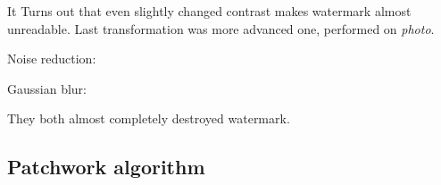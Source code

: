 \documentclass[a4paper, 12pt]{article}
\begin{document}
\newpage
    	It Turns out that even slightly changed contrast makes watermark almost unreadable. Last transformation was more advanced one, performed on \textit{photo}.

    	Noise reduction:

 		\begin{figure}[!h]%
			\centering
			\qquad
			\label{}%
		\end{figure}

		Gaussian blur:

 		\begin{figure}[!h]%
			\centering
			\qquad
			\label{}%
		\end{figure}


   	They both almost completely destroyed watermark.

	\subsection{Patchwork algorithm}
	
\end{document}
